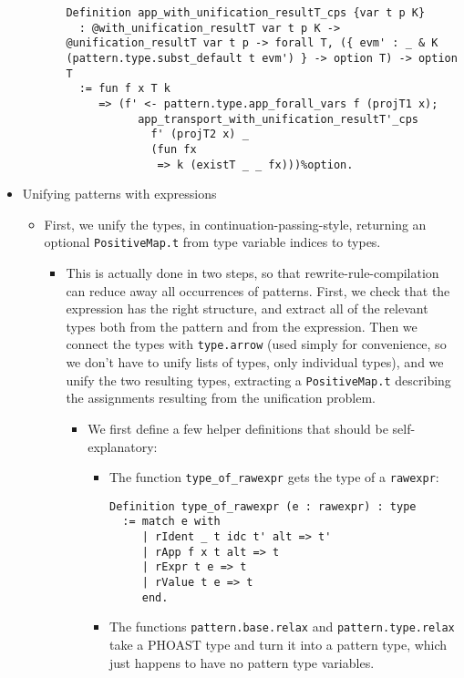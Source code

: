 \begin{itemize}
\begin{itemize}
\begin{itemize}
\begin{verbatim}
Definition app_with_unification_resultT_cps {var t p K}
  : @with_unification_resultT var t p K -> @unification_resultT var t p -> forall T, ({ evm' : _ & K (pattern.type.subst_default t evm') } -> option T) -> option T
  := fun f x T k
     => (f' <- pattern.type.app_forall_vars f (projT1 x);
           app_transport_with_unification_resultT'_cps
             f' (projT2 x) _
             (fun fx
              => k (existT _ _ fx)))%option.
\end{verbatim}
    \end{itemize}
  \end{itemize}
\item
  Unifying patterns with expressions

  \begin{itemize}
  \tightlist
  \item
    First, we unify the types, in continuation-passing-style, returning
    an optional \texttt{PositiveMap.t} from type variable indices to
    types.

    \begin{itemize}
    \tightlist
    \item
      This is actually done in two steps, so that
      rewrite-rule-compilation can reduce away all occurrences of
      patterns. First, we check that the expression has the right
      structure, and extract all of the relevant types both from the
      pattern and from the expression. Then we connect the types with
      \texttt{type.arrow} (used simply for convenience, so we don't have
      to unify lists of types, only individual types), and we unify the
      two resulting types, extracting a \texttt{PositiveMap.t}
      describing the assignments resulting from the unification problem.

      \begin{itemize}
      \item
        We first define a few helper definitions that should be
        self-explanatory:

        \begin{itemize}
        \item
          The function \texttt{type\_of\_rawexpr} gets the type of a
          \texttt{rawexpr}:

\begin{verbatim}
Definition type_of_rawexpr (e : rawexpr) : type
  := match e with
     | rIdent _ t idc t' alt => t'
     | rApp f x t alt => t
     | rExpr t e => t
     | rValue t e => t
     end.
\end{verbatim}
        \item
          The functions \texttt{pattern.base.relax} and
          \texttt{pattern.type.relax} take a PHOAST type and turn it
          into a pattern type, which just happens to have no pattern
          type variables.


\end{itemize}
\end{itemize}
\end{itemize}
\end{itemize}
\end{itemize}
